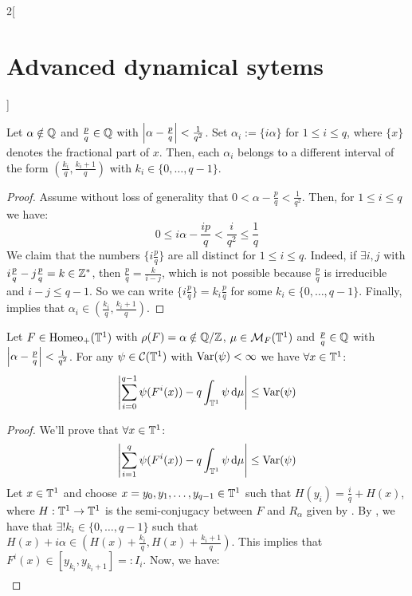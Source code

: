 \documentclass[../../../main_math.tex]{subfiles}
\begin{document}
\begin{multicols}{2}[\section{Advanced dynamical sytems}]
  \begin{lemma}\label{ADS:lema_alpha_i}
    Let $\alpha\notin\mathbb{Q}$ and $\frac{p}{q}\in \mathbb{Q}$ with $\abs{\alpha-\frac{p}{q}}<\frac{1}{q^2}$. Set $\alpha_i:=\{i\alpha\}$ for $1\leq i\leq q$, where $\{x\}$ denotes the fractional part of $x$. Then, each $\alpha_i$ belongs to a different interval of the form $\left(\frac{k_i}{q},\frac{k_i+1}{q}\right)$ with $k_i\in\{0,\ldots,q-1\}$.
  \end{lemma}
  \begin{proof}
    Assume without loss of generality that $0<\alpha-\frac{p}{q}<\frac{1}{q^2}$. Then, for $1\leq i\leq q$ we have:
    \begin{equation}\label{ADS:ineq_alpha_i}
      0\leq i\alpha -\frac{ip}{q}<\frac{i}{q^2}\leq \frac{1}{q}
    \end{equation}
    We claim that the numbers $\{i \frac{p}{q}\}$ are all distinct for $1\leq i\leq q$. Indeed, if $\exists i,j$ with $i\frac{p}{q} -j\frac{p}{q}=k\in\mathbb{Z}^*$, then $\frac{p}{q}=\frac{k}{i-j}$, which is not possible because $\frac{p}{q}$ is irreducible and $i-j \leq q-1$. So we can write $\{i \frac{p}{q}\}=k_i\frac{p}{q}$ for some $k_i\in\{0,\ldots,q-1\}$. Finally,  implies that $\alpha_i\in \left(\frac{k_i}{q},\frac{k_i+1}{q}\right)$.
  \end{proof}
  \begin{proposition}\label{ADS:denjoy_koksma}
    Let $F\in\mathrm{Homeo}_+(\mathbb{T}^1)$ with $\rho(F)=\alpha\notin \quot{\QQ}{\ZZ}$, $\mu\in\mathcal{M}_F(\mathbb{T}^1)$ and $\frac{p}{q}\in \mathbb{Q}$ with $\abs{\alpha-\frac{p}{q}}<\frac{1}{q^2}$. For any $\psi\in \mathcal{C}(\mathbb{T}^1)$ with $\mathrm{Var}(\psi)<\infty$ we have $\forall x \in \mathbb{T}^1$:
    $$
      \abs{\sum_{i=0}^{q-1}\psi(F^i(x))-q\int_{\mathbb{T}^1}\psi\dd{\mu}}\leq\mathrm{Var}(\psi)
    $$
  \end{proposition}
  \begin{proof}
    We'll prove that $\forall x\in \mathbb{T}^1$:
    $$
      \abs{\sum_{i=1}^q \psi(F^i(x))-q\int_{\mathbb{T}^1}\psi\dd{\mu}}\leq \mathrm{Var}(\psi)
    $$
    Let $x\in \mathbb{T}^1$ and choose $x=y_0,y_1,\ldots,y_{q-1}\in \mathbb{T}^1$ such that $H(y_i)=\frac{i}{q}+H(x)$, where $H:\mathbb{T}^1\to \mathbb{T}^1$ is the semi-conjugacy between $F$ and $R_\alpha$ given by . By , we have that $\exists! k_i\in\{0,\ldots,q-1\}$ such that $H(x)+i\alpha\in\left( H(x)+ \frac{k_i}{q},H(x)+\frac{k_i+1}{q}\right)$. This implies that $F^i(x)\in [y_{k_i},y_{k_i+1}]=:I_i$. Now, we have:
    \begin{multline*}

\end{multline*}
\end{proof}
\end{multicols}
\end{document}
